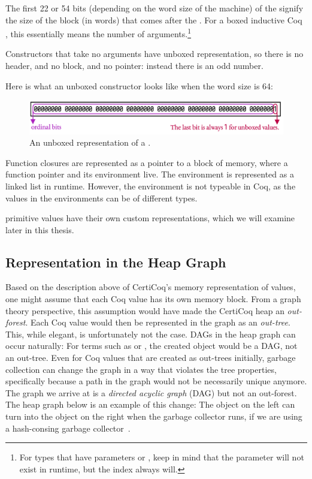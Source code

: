 The first 22 or 54 bits (depending on the word size of the machine) of the \header{} signify the size of the block (in words) that comes after the \header{}. For a \gls{boxed} inductive Coq \constructor, this essentially means the number of arguments.\footnote{For types that have \glspl{parameter} or , keep in mind that the parameter will not exist in runtime, but the index always will.}

Constructors that take no arguments have \gls{unboxed} representation, so there is no header, and no block, and no pointer: instead there is an odd number.

Here is what an unboxed constructor looks like when the word size is 64:

\begin{figure}[H]
\includegraphics[scale=.59]{figures/unboxed-value.pdf}
\centering
\caption{An \gls{unboxed} representation of a \constructor{}.}
\end{figure}

Function \gls{closure}s are represented as a pointer to a block of memory, where a function pointer and its environment live. The environment is represented as a linked list in runtime. However, the environment is not typeable in Coq, as the values in the environments can be of different types.

\Gls{primitive} values have their own custom representations, which we will examine later in this thesis.

\subsection{Representation in the Heap Graph}

Based on the description above of CertiCoq's memory representation of values, one might assume that each Coq value has its own memory block. From a graph theory perspective, this assumption would have made the CertiCoq heap an \emph{out-forest}. Each Coq value would then be represented in the graph as an \emph{out-tree}. This, while elegant, is unfortunately not the case. DAGs in the heap graph can occur naturally: For terms such as  or \code{[\bn{x}; \bn{x}; \bn{x}]}, the created object would be a DAG, not an out-tree. Even for Coq values that are created as out-trees initially, garbage collection can change the graph in a way that violates the tree properties, specifically because a path in the graph would not be necessarily unique anymore. The graph we arrive at is a \emph{directed acyclic graph} (DAG) but not an out-forest. The heap graph below is an example of this change: The object on the left can turn into the object on the right when the garbage collector runs, if we are using a hash-consing garbage collector~\cite{appel1993hash}.

